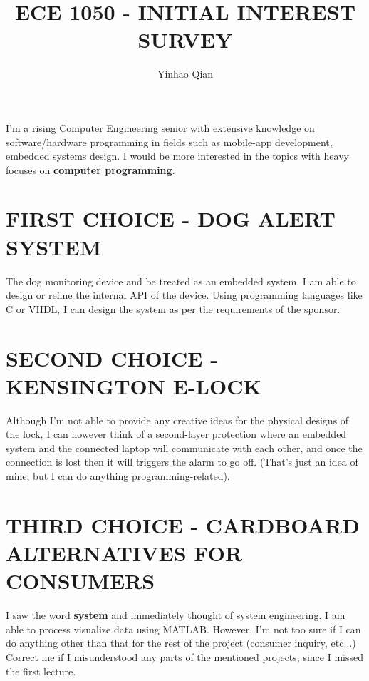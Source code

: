 \documentclass{article}
\title{ECE 1050 - INITIAL INTEREST SURVEY}
\author{Yinhao Qian}
\begin{document}
	\maketitle
	I'm a rising Computer Engineering senior with extensive knowledge on software/hardware programming in fields such as mobile-app development, embedded systems design. I would be more interested in the topics with heavy focuses on \textbf{computer programming}.
	\section{FIRST CHOICE - DOG ALERT SYSTEM}
	The dog monitoring device and be treated as an embedded system. I am able to design or refine the internal API of the device. Using programming languages like C or VHDL, I can design the system as per the requirements of the sponsor.
	\section{SECOND CHOICE - KENSINGTON E-LOCK}
	Although I'm not able to provide any creative ideas for the physical designs of the lock, I can however think of a second-layer protection where an embedded system and the connected laptop will communicate with each other, and once the connection is lost then it will triggers the alarm to go off. (That's just an idea of mine, but I can do anything programming-related).
	\section{THIRD CHOICE - CARDBOARD ALTERNATIVES FOR CONSUMERS}
	I saw the word \textbf{system} and immediately thought of system engineering. I am able to process visualize data using MATLAB. However, I'm not too sure if I can do anything other than that for the rest of the project (consumer inquiry, etc...)
	\newline\newline
	Correct me if I misunderstood any parts of the mentioned projects, since I missed the first lecture.
\end{document}
